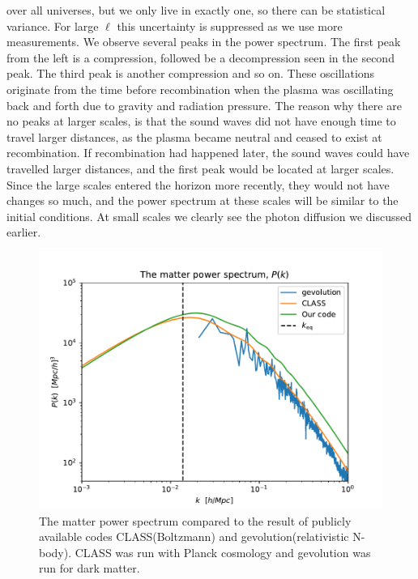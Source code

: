 \documentclass{aa}
\begin{document}
over all universes, but we only live in exactly one, so there can be statistical variance. For large $\ell$ this uncertainty is suppressed as we use more measurements.
We observe several peaks in the power spectrum. The first peak from the left is a compression, followed be a decompression seen in the second peak. The third peak is another 
compression and so on. These oscillations originate from the time before recombination when the plasma was oscillating back and forth due to gravity and radiation pressure. The reason why there are 
no peaks at larger scales, is that the sound waves did not have enough time to travel larger distances, as the plasma became neutral and ceased to exist at recombination. If recombination had happened later, the sound waves could have travelled
larger distances, and the first peak would be located at larger scales. Since the large scales entered the horizon more recently, they would not have changes so much, and the power spectrum at these scales will be similar
to the initial conditions. 
At small scales we clearly see the photon diffusion we discussed earlier.


\begin{figure}[h!]
   \includegraphics[scale=0.6]{../figures/milestone4/matter_PS.pdf}
   \caption{The matter power spectrum compared to the result of publicly available codes CLASS(Boltzmann) and gevolution(relativistic N-body). CLASS was run with Planck cosmology and gevolution was run for dark matter.}\label{fig:m4_matter_PS}
\end{figure}
\end{document}
